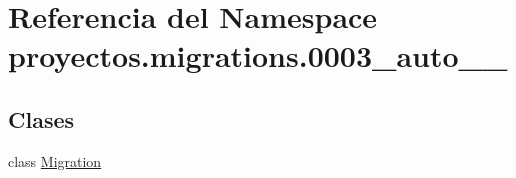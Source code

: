 \hypertarget{namespaceproyectos_1_1migrations_1_10003__auto__20160610__2156}{}\section{Referencia del Namespace proyectos.\+migrations.0003\+\_\+auto\+\_\+\_}
\label{namespaceproyectos_1_1migrations_1_10003__auto__20160610__2156}
\subsection*{Clases}
\begin{DoxyCompactItemize}
\item 
class \hyperlink{classproyectos_1_1migrations_1_10003__auto__20160610__2156_1_1_migration}{Migration}
\end{DoxyCompactItemize}
